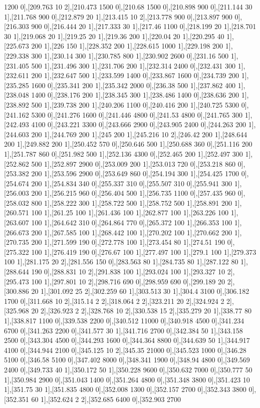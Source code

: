{1200 0],[209.763 10 2],[210.473 1500 0],[210.68 1500 0],[210.898 900 0],[211.144 30 1],[211.768 900 0],[212.879 20 1],[213.415 10 2],[213.778 900 0],[213.897 900 0],[216.303 900 0],[216.444 20 1],[217.333 30 1],[217.46 1100 0],[218.199 20 1],[218.701 30 1],[219.068 20 1],[219.25 20 1],[219.36 200 1],[220.04 20 1],[220.295 40 1],[225.673 200 1],[226 150 1],[228.352 200 1],[228.615 1000 1],[229.198 200 1],[229.338 300 1],[230.14 300 1],[230.785 800 1],[230.902 2600 0],[231.16 500 1],[231.405 500 1],[231.496 300 1],[231.706 200 1],[232.314 2400 0],[232.431 300 1],[232.611 200 1],[232.647 500 1],[233.599 1400 0],[233.867 1600 0],[234.739 200 1],[235.285 1600 0],[235.341 200 1],[235.342 2000 0],[236.38 500 1],[237.862 400 1],[238.048 1400 0],[238.176 200 1],[238.345 300 1],[238.486 1400 0],[238.636 200 1],[238.892 500 1],[239.738 200 1],[240.206 1100 0],[240.416 200 1],[240.725 5300 0],[241.162 5300 0],[241.276 1600 0],[241.446 4800 0],[241.53 4800 0],[241.765 300 1],[242.493 4100 0],[243.221 3300 0],[243.666 2900 0],[243.905 2400 0],[244.263 200 1],[244.603 200 1],[244.769 200 1],[245 200 1],[245.216 10 2],[246.42 200 1],[248.644 200 1],[249.882 200 1],[250.452 570 0],[250.646 500 1],[250.688 360 0],[251.116 200 1],[251.787 860 0],[251.982 500 1],[252.136 4300 0],[252.465 200 1],[252.497 300 1],[252.862 500 1],[252.897 2900 0],[253.009 200 1],[253.013 720 0],[253.218 860 0],[253.382 200 1],[253.596 2900 0],[253.649 860 0],[254.194 300 1],[254.425 1700 0],[254.674 200 1],[254.834 340 0],[255.337 310 0],[255.507 310 0],[255.941 300 1],[256.003 200 1],[256.215 960 0],[256.404 500 1],[256.735 1100 0],[257.435 960 0],[258.032 800 1],[258.222 300 1],[258.722 500 1],[258.752 500 1],[258.891 200 1],[260.571 100 1],[261.25 100 1],[261.436 100 1],[262.877 100 1],[263.226 100 1],[263.607 100 1],[264.642 310 0],[264.864 770 0],[265.372 100 1],[266.353 100 1],[266.673 200 1],[267.585 100 1],[268.442 100 1],[270.202 100 1],[270.662 200 1],[270.735 200 1],[271.599 190 0],[272.778 100 1],[273.454 80 1],[274.51 190 0],[275.322 100 1],[276.419 190 0],[276.67 100 1],[277.497 100 1],[279.1 100 1],[279.373 100 1],[281.175 20 2],[281.556 150 0],[283.563 80 1],[284.735 80 1],[287.122 80 1],[288.644 190 0],[288.831 10 2],[291.838 100 1],[293.024 100 1],[293.327 10 2],[295.473 100 1],[297.801 10 2],[298.716 690 0],[298.959 690 0],[299.189 20 2],[300.886 20 1],[301.092 25 2],[302.259 60 1],[303.513 30 1],[304.4 3100 0],[306.182 1700 0],[311.668 10 2],[315.14 2 2],[318.064 2 2],[323.211 20 2],[324.924 2 2],[325.968 20 2],[326.923 2 2],[328.768 10 2],[330.538 15 2],[335.279 20 1],[338.77 80 1],[338.817 1100 0],[339.538 2200 0],[340.512 11000 0],[340.918 4500 0],[341.234 6700 0],[341.263 2200 0],[341.577 30 1],[341.716 2700 0],[342.384 50 1],[343.158 2500 0],[343.304 4500 0],[344.293 1600 0],[344.364 8800 0],[344.639 50 1],[344.917 4100 0],[344.944 2100 0],[345.125 10 2],[345.35 21000 0],[345.523 1000 0],[346.28 5100 0],[346.58 5100 0],[347.402 8000 0],[348.341 1900 0],[348.94 4800 0],[349.569 2400 0],[349.733 40 1],[350.172 50 1],[350.228 9600 0],[350.632 7000 0],[350.777 50 1],[350.984 2900 0],[351.043 1400 0],[351.264 4800 0],[351.348 3800 0],[351.423 10 1],[351.75 30 1],[351.835 4800 0],[352.008 1300 0],[352.157 2700 0],[352.343 3800 0],[352.351 60 1],[352.624 2 2],[352.685 6400 0],[352.903 2700 }
